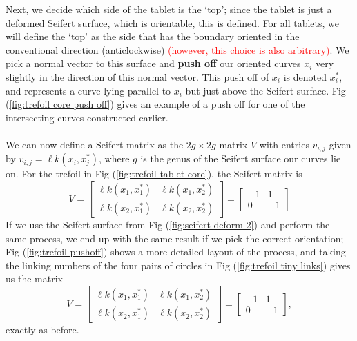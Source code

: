 \documentclass{article}
\begin{document}
Next, we decide which side of the tablet is the `top'; since the tablet is just a deformed Seifert surface, which is orientable, this is defined. For all tablets, we will define the `top' as the side that has the boundary oriented in the conventional direction (anticlockwise) \textcolor{red}{(however, this choice is also arbitrary)}. We pick a normal vector to this surface and \textbf{push off} our oriented curves $x_i$ very slightly in the direction of this normal vector. This push off of $x_i$ is denoted $x^*_i$, and represents a curve lying parallel to $x_i$ but just above the Seifert surface. Fig (\ref{fig:trefoil core push off}) gives an example of a push off for one of the intersecting curves constructed earlier.\\
\\
We can now define a Seifert matrix as the $2g \times 2g$ matrix $V$ with entries $v_{i,j}$ given by $v_{i,j}=\ell k(x_i,x^*_j)$, where $g$ is the genus of the Seifert surface our curves lie on. For the trefoil in Fig (\ref{fig:trefoil tablet core}), the Seifert matrix is
$$V=\begin{bmatrix}\ell k(x_1,x^*_1)&\ell k(x_1,x^*_2)\\\ell k(x_2,x^*_1)&\ell k(x_2,x^*_2)\end{bmatrix}=\begin{bmatrix}-1&1\\0&-1\end{bmatrix}$$
If we use the Seifert surface from Fig (\ref{fig:seifert deform 2}) and perform the same process, we end up with the same result if we pick the correct orientation; Fig (\ref{fig:trefoil pushoff}) shows a more detailed layout of the process, and taking the linking numbers of the four pairs of circles in Fig (\ref{fig:trefoil tiny links}) gives us the matrix $$V=\begin{bmatrix}\ell k(x_1,x^*_1)&\ell k(x_1,x^*_2)\\\ell k(x_2,x^*_1)&\ell k(x_2,x^*_2)\end{bmatrix}=\begin{bmatrix}-1&1\\0&-1\end{bmatrix},$$ exactly as before.\\
\\
\end{document}
